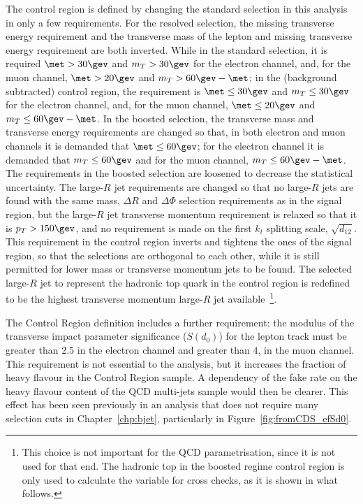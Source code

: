 The control region is defined by changing the standard selection in this analysis in only a few requirements. For the resolved selection,
the missing transverse energy requirement and the transverse mass of the lepton and missing transverse energy requirement are both inverted.
While in the standard selection, it is required $\met > 30\gev$ and $m_{T} >30\gev$ for the electron channel, and, for the muon channel,
$\met > 20\gev$ and $m_{T} > 60\gev - \met$;
in the (background subtracted) control region, the requirement is $\met \leq 30\gev$ and $m_{T} \leq 30\gev$ for the electron channel, and, for the muon channel,
$\met \leq 20\gev$ and $m_{T} \leq 60\gev - \met$.
In the boosted selection, the transverse mass and transverse energy requirements are changed so that, in both electron and muon channels it is demanded that $\met \leq 60\gev$;
for the electron channel it is demanded that $m_T \leq 60\gev$ and for the muon channel, $m_T \leq 60\gev - \met$. The requirements in the boosted selection are loosened to
decrease the statistical uncertainty. The large-$R$ jet requirements are changed so that no large-$R$ jets are found with the same mass, $\Delta R$ and $\Delta \Phi$ selection
requirements as in the signal region, but the
large-$R$ jet transverse momentum requirement is relaxed so that it is $p_T > 150\gev$, and no requirement is made on the first $k_t$ splitting scale, $\sqrt{d_{12}}$.
This requirement in the control region inverts and tightens the ones of the signal region, so that the selections are orthogonal to each other, while it is still permitted
for lower mass or transverse momentum jets to be found. The selected large-$R$ jet to represent the hadronic top quark in the
control region is redefined to be the highest transverse momentum large-$R$ jet available~\footnote{This choice is not important for the QCD parametrisation, since it is
not used for that end. The hadronic top in the boosted regime control region is only used to calculate the \mtt variable for cross checks, as it is shown in what follows.}.

The Control Region definition includes a further requirement: the modulus of the transverse impact parameter significance ($S(d_0)$)
for the lepton track must be greater than $2.5$ in the electron
channel and greater than $4$, in the muon channel. This requirement is not essential to the analysis, but it increases the fraction of heavy flavour in the
Control Region sample. A dependency of the fake rate on the heavy flavour content of the QCD multi-jets sample would then be clearer.
This effect has been seen previously in
an analysis that does not require many selection cuts in Chapter~\ref{chp:bjet}, particularly in Figure~\ref{fig:fromCDS_efSd0}.


